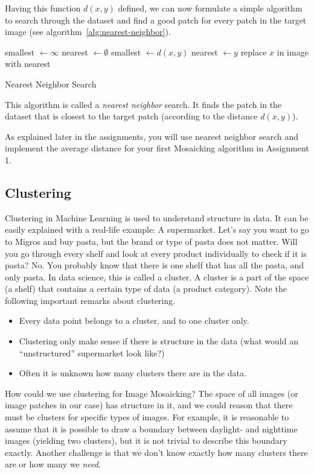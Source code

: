 \documentclass[a4paper]{article}
\begin{document}
		Having this function $d(x, y)$ defined, we can now formulate a simple algorithm to search through the dataset and find a good patch for every patch in the target image (see algorithm~\ref{alg:nearest-neighbor}). 
		\begin{algorithm}[bt]
			\begin{algorithmic} 
					\STATE smallest $\leftarrow \infty$
					\STATE nearest $\leftarrow \emptyset$
						\STATE smallest $\leftarrow d(x, y)$
						\STATE nearest $\leftarrow y$
						\ENDIF
					\ENDFOR
					\STATE replace $x$ in image with nearest
				\ENDFOR
			\end{algorithmic}
			\caption{Nearest Neighbor Search}
			\label{alg:nearest-neighbor}
		\end{algorithm}
		This algorithm is called a \emph{nearest neighbor} search. 
		It finds the patch in the dataset that is closest to the target patch (according to the distance $d(x,y)$).
		
		As explained later in the assignments, you will use nearest neighbor search and implement the average distance for your first Mosaicking algorithm in Assignment 1.
		
	\subsection{Clustering}
		Clustering in Machine Learning is used to understand structure in data. 
		It can be easily explained with a real-life example: A supermarket.
		Let's say you want to go to Migros and buy pasta, but the brand or type of pasta does not matter.
		Will you go through every shelf and look at every product individually to check if it is pasta? 
		No. 
		You probably know that there is one shelf that has all the pasta, and only pasta.
		In data science, this is called a cluster.
		A cluster is a part of the space (a shelf) that contains a certain type of data (a product category).
		Note the following important remarks about clustering.
		\begin{itemize}
			\item Every data point belongs to a cluster, and to one cluster only.
			\item Clustering only make sense if there is structure in the data (what would an ``unstructured'' supermarket look like?)
			\item Often it is unknown how many clusters there are in the data.
		\end{itemize}
		How could we use clustering for Image Mosaicking?
		The space of all images (or image patches in our case) has structure in it, and we could reason that there must be clusters for specific types of images. For example, it is reasonable to assume that it is possible to draw a boundary between daylight- and nighttime images (yielding two clusters), but it is not trivial to describe this boundary exactly.
		Another challenge is that we don't know exactly how many clusters there are or how many we \emph{need}.
		
\end{document}
